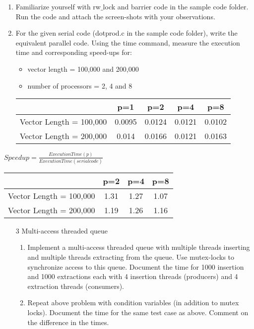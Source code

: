 \documentclass{sem5}
\author{Dilip Puri}
\begin{document}
\begin{enumerate}
\item Familiarize yourself with rw$\_$lock and barrier code in the sample code folder. Run the code and attach the screen-shots with your observations.
\item For the given serial code (dotprod.c in the sample code folder), write the equivalent parallel code. Using the time command, measure the execution time and corresponding speed-ups for:\\
\begin{itemize}
\item vector length = 100,000 and 200,000
\item number of processors = 2, 4 and 8
\end{itemize}
\begin{center}
\begin{tabular}{|c|c|c|c|c|}
\hline
& p=1 & p=2 & p=4 & p=8\\
\hline
Vector Length = 100,000 & 0.0095 & 0.0124 & 0.0121 & 0.0102 \\
\hline
Vector Length = 200,000 & 0.014 & 0.0166 & 0.0121 & 0.0163 \\
\hline
\end{tabular}

\end{center}
\end{enumerate}
\begin{center}
$Speedup = \frac{Execution Time(p)}{Execution Time(serial code)}$\\
\vspace*{1cm}
\begin{tabular}{|c|c|c|c|}
\hline
 & p=2 & p=4 & p=8\\
\hline
Vector Length = 100,000 & 1.31 & 1.27 & 1.07 \\
\hline
Vector Length = 200,000 & 1.19 & 1.26 & 1.16 \\
\hline
\end{tabular}
\end{center}
\begin{itemize}
\item[3] Multi-access threaded queue
\begin{enumerate}
\item Implement a multi-access threaded queue with multiple threads inserting and multiple threads extracting from the queue. Use mutex-locks to synchronize access to this queue. Document the time for 1000 insertion and 1000 extractions each with 4 insertion threads (producers) and 4 extraction threads (consumers).

\item Repeat above problem with condition variables (in addition to mutex locks). Document the time for the same test case as above. Comment on the difference in the times.

\end{enumerate}
\end{itemize}
\end{document}
